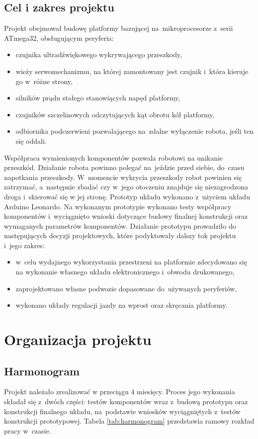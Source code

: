 \documentclass[11pt]{article}
\begin{document}
\subsection{Cel i zakres projektu}
Projekt obejmował budowę platformy bazującej na~mikroprocesorze z~serii ATmega32, obsługującym peryferia:
\begin{itemize}
	\item czujnika ultradźwiękowego wykrywającego przeszkody,
	\item wieży serwomechanizmu, na której zamontowany jest czujnik i~która kieruje go w~różne strony,
	\item silników prądu stałego stanowiących napęd platformy,
	\item czujników szczelinowych odczytujących kąt obrotu kół platformy,
	\item odbiornika podczerwieni pozwalającego na~zdalne wyłączenie robota, jeśli ten się oddali.
\end{itemize}
Współpraca wymienionych komponentów pozwala robotowi na unikanie przeszkód.
Działanie robota powinno polegać na~jeździe przed siebie, do~czasu napotkania przeszkody.
W~momencie wykrycia przeszkody robot powinien się zatrzymać, a~następnie zbadać czy w~jego otoczeniu znajduje się niezagrodzona droga i~skierować się w jej stronę.
Prototyp układu wykonano z~użyciem układu Arduino Leonardo.
Na wykonanym prototypie wykonano testy współpracy komponentów i~wyciągnięto wnioski dotyczące budowy finalnej konstrukcji oraz wymaganych parametrów komponentów.
Działanie prototypu prowadziło do następujących decyzji projektowych, które podyktowały dalszy tok projektu i~jego zakres:
\begin{itemize}
	\item w~celu wydajnego wykorzystania przestrzeni na platformie zdecydowano się na wykonanie własnego układu elektronicznego i~obwodu drukowanego,
	\item zaprojektowano własne podwozie dopasowane do~używanych peryferiów,
	\item wykonano układy regulacji jazdy na wprost oraz skręcania platformy.
\end{itemize}

\section{Organizacja projektu}
\subsection{Harmonogram}
Projekt należało zrealizować w przeciągu 4 miesięcy.
Proces jego wykonania składał się z~dwóch części: testów komponentów wraz z~budową prototypu oraz konstrukcji finalnego układu, na~podstawie wniosków wyciągniętych z~testów konstrukcji prototypowej.
	Tabela \ref{tab:harmonogram} przedstawia ramowy rozkład pracy w~czasie.
\end{document}

